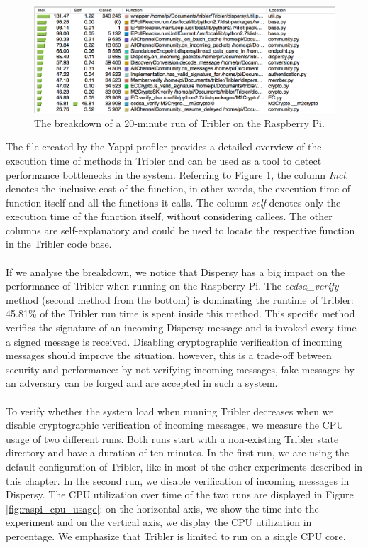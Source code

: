 \begin{figure}[!h]
	\centering
	\includegraphics[width=1.0\columnwidth]{images/experiments/yappi_breakdown}
	\caption{The breakdown of a 20-minute run of Tribler on the Raspberry Pi.}
	\label{fig:yappi_breakdown}
\end{figure}

The file created by the Yappi profiler provides a detailed overview of the execution time of methods in Tribler and can be used as a tool to detect performance bottlenecks in the system. Referring to Figure \ref{fig:yappi_breakdown}, the column \emph{Incl.} denotes the inclusive cost of the function, in other words, the execution time of function itself and all the functions it calls. The column \emph{self} denotes only the execution time of the function itself, without considering callees. The other columns are self-explanatory and could be used to locate the respective function in the Tribler code base.\\\\
If we analyse the breakdown, we notice that Dispersy has a big impact on the performance of Tribler when running on the Raspberry Pi. The \emph{ecdsa\_verify} method (second method from the bottom) is dominating the runtime of Tribler: 45.81\% of the Tribler run time is spent inside this method. This specific method verifies the signature of an incoming Dispersy message and is invoked every time a signed message is received. Disabling cryptographic verification of incoming messages should improve the situation, however, this is a trade-off between security and performance: by not verifying incoming messages, fake messages by an adversary can be forged and are accepted in such a system.\\\\
To verify whether the system load when running Tribler decreases when we disable cryptographic verification of incoming messages, we measure the CPU usage of two different runs. Both runs start with a non-existing Tribler state directory and have a duration of ten minutes. In the first run, we are using the default configuration of Tribler, like in most of the other experiments described in this chapter. In the second run, we disable verification of incoming messages in Dispersy. The CPU utilization over time of the two runs are displayed in Figure \ref{fig:raspi_cpu_usage}: on the horizontal axis, we show the time into the experiment and on the vertical axis, we display the CPU utilization in percentage. We emphasize that Tribler is limited to run on a single CPU core.\\\\

